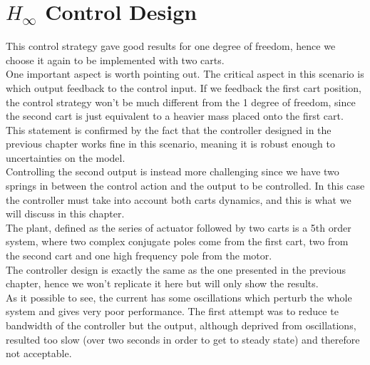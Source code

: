 \section{$H_\infty$ Control Design}
This control strategy gave good results for one degree of freedom, hence we choose it again to be implemented with two carts.\\

One important aspect is worth pointing out. The critical aspect in this scenario is which output feedback to the control input. If we feedback the first cart position, the control strategy won't be much different from the 1 degree of freedom, since the second cart is just equivalent to a heavier mass placed onto the first cart. This statement is confirmed by the fact that the controller designed in the previous chapter works fine in this scenario, meaning it is robust enough to uncertainties on the model.\\

Controlling the second output is instead more challenging since we have two springs in between the control action and the output to be controlled. In this case the controller must take into account both carts dynamics, and this is what we will discuss in this chapter.\\


The plant, defined as the series of actuator followed by two carts is a 5th order system, where two complex conjugate poles come from the first cart, two from the second cart and one high frequency pole from the motor.\\

The controller design is exactly the same as the one presented in the previous chapter, hence we won't replicate it here but will only show the results.\\

As it possible to see, the current has some oscillations which perturb the whole system and gives very poor performance. The first attempt was to reduce te bandwidth of the controller but the output, although deprived from oscillations, resulted too slow (over two seconds in order to get to steady state) and therefore not acceptable.\\

